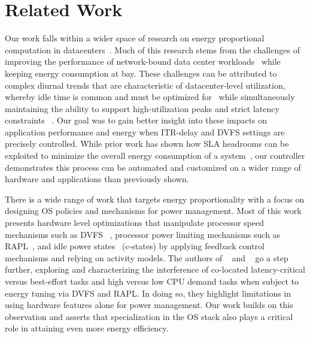 \section{Related Work}
\label{sec:related}
Our work falls within a wider space of research on energy proportional computation in datacenters~\cite{energyproportion, warehouse-power, 268014}. Much of this research stems from the challenges of improving the performance of network-bound data center workloads~\cite{large-scale-mapreduce, mica, zygos} while keeping energy consumption at bay. These challenges can be attributed to complex diurnal trends that are characteristic of datacenter-level utilization, whereby idle time is common and must be optimized for~\cite{hotpower2008, powernap, napsac} while simultaneously maintaining the ability to support high-utilization peaks and strict latency constraints ~\cite{Dynamo, SmoothOperator, oldi-pegasus, adrenaline, rubik, eurosys14, zygos, peafowl, 7425206, 10.1145/2830772.2830779, dreamweaver, dynsleep, udpm}. Our goal was to gain better insight into these impacts on application performance and energy when ITR-delay and DVFS settings are precisely controlled. While prior work has shown how SLA headrooms can be exploited to minimize the overall energy consumption of a system~\cite{Dynamo, SmoothOperator, oldi-pegasus, adrenaline, rubik, eurosys14, zygos, peafowl, 7425206, 10.1145/2830772.2830779, dreamweaver, dynsleep, udpm}, our controller demonstrates this process can be automated and customized on a wider range of hardware and applications than previously shown.

There is a wide range of work that targets energy proportionality with a focus on designing OS policies and mechanisms for power management. Most of this work presents hardware level optimizations that manipulate processor speed mechanisms such as DVFS ~\cite{10.5555/2523721.2523732,10.1145/381677.381702,cpufreq_governor,4273098,packandcap,10.1109/MICRO.2006.8,1598114,10.1145/1629911.1629926,4658633,4343825,10.1109/IGCC.2011.6008552,10.1145/1241601.1241609, slowdownorsleep,4228267, mootaz}, processor power limiting mechanisms such as RAPL~\cite{intel_rapl, heracles, SmoothOperator,oldi-pegasus, Dynamo,PerAppPower,powercap}, and idle power states~\cite{cpuidle_policy,peafowl, udpm,6983037,dreamweaver, pacingtoidle} (c-states) by applying feedback control mechanisms and relying on activity models. The authors of ~\cite{heracles} and ~\cite{PerAppPower} go a step further, exploring and characterizing the interference of co-located latency-critical versus best-effort tasks and high versus low CPU demand tasks when subject to energy tuning via DVFS and RAPL. In doing so, they highlight limitations in using hardware features alone for power management. Our work builds on this observation and asserts that specialization in the OS stack also plays a critical role in attaining even more energy efficiency. 

